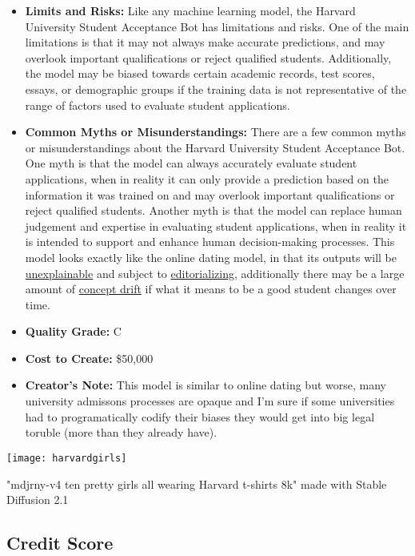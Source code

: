 \begin{itemize}
\begin{enumerate}
        \end{enumerate}
    \item \textbf{Limits and Risks:} Like any machine learning model, the Harvard University Student Acceptance Bot has limitations and risks. One of the main limitations is that it may not always make accurate predictions, and may overlook important qualifications or reject qualified students. Additionally, the model may be biased towards certain academic records, test scores, essays, or demographic groups if the training data is not representative of the range of factors used to evaluate student applications.
    \item \textbf{Common Myths or Misunderstandings:} There are a few common myths or misunderstandings about the Harvard University Student Acceptance Bot. One myth is that the model can always accurately evaluate student applications, when in reality it can only provide a prediction based on the information it was trained on and may overlook important qualifications or reject qualified students. Another myth is that the model can replace human judgement and expertise in evaluating student applications, when in reality it is intended to support and enhance human decision-making processes. This model looks exactly like the online dating model, in that its outputs will be \hyperref[sec:explain]{unexplainable} and subject to \hyperref[sec:janitor]{editorializing}, additionally there may be a large amount of \hyperref[sec:drift]{concept drift} if what it means to be a good student changes over time. 
    \item \textbf{Quality Grade:} C
    \item \textbf{Cost to Create:} \$50,000
    \item \textbf{Creator's Note:} This model is similar to online dating but worse, many university admissons processes are opaque and I'm sure if some universities had to programatically codify their biases they would get into big legal toruble (more than they already have).
\end{itemize}

\begin{marginfigure}[-5.5cm]
        \texttt{[image: harvardgirls]}
        \caption{"mdjrny-v4 ten pretty girls all wearing Harvard t-shirts 8k" made with Stable Diffusion 2.1}
\end{marginfigure}

\subsection{Credit Score}

